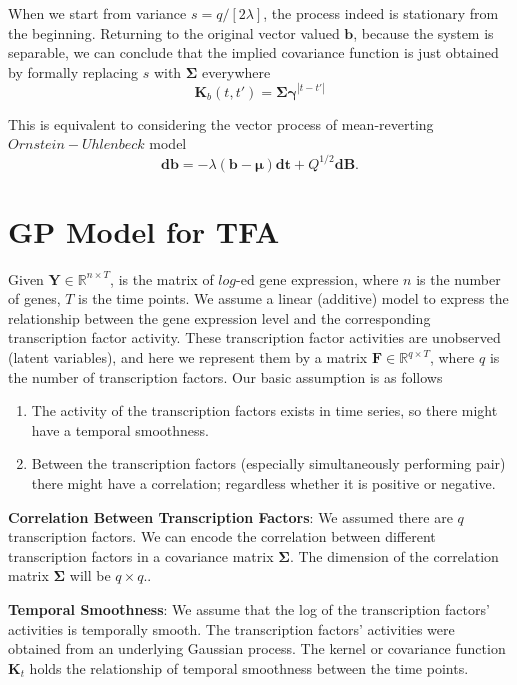 When we start from variance $s = q / \left[2 \lambda\right]$, the process indeed is stationary from the beginning. Returning to the original vector valued $\textbf{b}$, because the system is separable, we can conclude that the implied covariance function is just obtained by formally replacing $s$ with $\boldsymbol{\Sigma}$ everywhere
\begin{equation}
\textbf{K}_b(t,t') = \boldsymbol{\Sigma} \boldsymbol{\gamma}^{\left|t-t'\right|}
\end{equation}

This is equivalent to considering the vector process of mean-reverting $Ornstein-Uhlenbeck$ model
\begin{equation}
\textbf{db} = -\lambda (\textbf{b} - \boldsymbol{\mu}) \textbf{dt} + Q^{1/2} \textbf{dB}.
\end{equation}

\section{GP Model for TFA}\label{sec:Model_for_TFA}
Given $\mathbf{Y} \in \mathbb{R}^{n\times T}$, is the matrix of $log$-ed gene expression, where $n$ is the number of genes, $T$ is the time points. We assume a linear (additive) model to express the relationship between the gene expression level and the corresponding transcription factor activity. These transcription factor activities are unobserved (latent variables), and here we represent them by a matrix $\mathbf{F} \in \mathbb{R}^{q\times T}$, where $q$ is the number of transcription factors. Our basic assumption is as follows
\begin{enumerate}
	\item The activity of the transcription factors exists in time series, so there might have a temporal smoothness. 
	\item Between the transcription factors (especially simultaneously performing pair) there might have a correlation; regardless whether it is positive or negative.  %
\end{enumerate}

\textbf{Correlation Between Transcription Factors}: We assumed there are $q$ transcription factors. We can encode the correlation between different transcription factors in a covariance matrix $\boldsymbol{\Sigma}$. The dimension of the correlation matrix $\boldsymbol{\Sigma}$ will be $q\times q$.. 

\textbf{Temporal Smoothness}: We assume that the log of the transcription factors' activities is temporally smooth.  The transcription factors' activities were obtained from an underlying Gaussian process. The kernel or covariance function $\mathbf{K}_t$ holds the relationship of temporal smoothness between the time points. 

